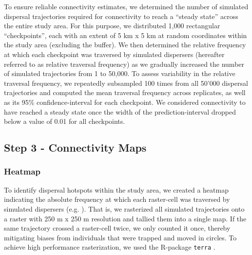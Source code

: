 \documentclass[abstract=on,10pt,a4paper,bibliography=totocnumbered]{article}
\begin{document}
To ensure reliable connectivity estimates, we determined the number of simulated
dispersal trajectories required for connectivity to reach a  ``steady state''
across the entire study area. For this purpose, we distributed 1,000 rectangular
``checkpoints'', each with an extent of 5 km x 5 km at random coordinates within
the study area (excluding the buffer). We then determined the relative frequency
at which each checkpoint was traversed by simulated dispersers (hereafter
referred to as relative traversal frequency) as we gradually increased the
number of simulated trajectories from 1 to 50,000. To assess variability in the
relative traversal frequency, we repeatedly subsampled 100 times from all 50'000
dispersal trajectories and computed the mean traversal frequency across
replicates, as well as its 95\% confidence-interval for each checkpoint. We
considered connectivity to have reached a steady state once the width of the
prediction-interval dropped below a value of 0.01 for all checkpoints.

\subsection{Step 3 - Connectivity Maps}
\subsubsection{Heatmap}
To identify dispersal hotspots within the study area, we created a heatmap
indicating the absolute frequency at which each raster-cell was traversed by
simulated dispersers (e.g. \citealp{Peer.2008, Hauenstein.2019, Zeller.2020}).
That is, we rasterized all simulated trajectories onto a raster with 250 m x 250
m resolution and tallied them into a single map. If the same trajectory crossed
a raster-cell twice, we only counted it once, thereby mitigating biases from
individuals that were trapped and moved in circles. To achieve high performance
rasterization, we used the R-package {\tt terra} \citep{Hijmans.2021b}.
\end{document}
